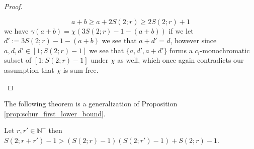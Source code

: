 \begin{proof}
\begin{enumerate}
\begin{itemize}
			            \begin{equation*}
				            a + b \geq a + 2S(2; r) \geq 2S(2; r) + 1
			            \end{equation*}
			            we have $\gamma(a + b) = \chi(3S(2; r) - 1 - (a + b))$ if we let $d' := 3S(2; r) - 1 - (a + b)$ we see that $a + d' = d$, however since $a, d, d' \in [1; S(2; r) - 1]$ we see that $\{a, d', a + d'\}$ forms a $c_{i}$-monochromatic subset of $[1; S(2; r) - 1]$ under $\chi$ as well, which once again contradicts our assumption that $\chi$ is sum-free. \qedhere
		      \end{itemize}
	\end{enumerate}
\end{proof}

The following theorem is a generalization of Proposition \ref{prop:schur_first_lower_bound}.
\begin{theorem}\label{thm:ass_schur}
	Let $r, r' \in \mathbb{N}^{+}$ then $S(2; r + r') - 1 > (S(2; r) - 1)(S(2; r') - 1) + S(2; r) - 1$.
\end{theorem}
